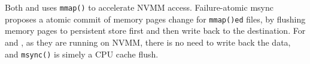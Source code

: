 Both \DAChell{} and \CChell uses \texttt{mmap()} to accelerate NVMM access.
Failure-atomic msync~\cite{atomicmsync} proposes a atomic commit of memory
pages change for \texttt{mmap()ed} files, by flushing memory pages to persistent
store first and then write back to the destination. For \DAChell{} and \CChell{}, as they are running on NVMM, there is no need to write back the data, and
\texttt{msync()} is simely a CPU cache flush.

\begin{comment}
We see two potential future improvements for \Chell{}. First, we hope to improve
it by adding
strong consistency and protection from malicious writes. Second, at present 
\Chell{} cannot avoid
\texttt{memcpy()} entirely, because POSIX APIs provide user buffers to fill with
data. If we modify the POSIX interfaces that return cache pages to applications
directly we can eliminate \texttt{memcpy}.
\end{comment}
